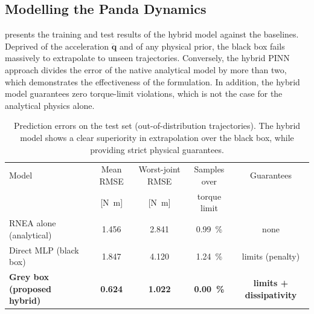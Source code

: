 \documentclass[a4paper, oneside]{article}
\newcommand{\qdd}{\ensuremath{\boldsymbol{\ddot{q}}}}
\begin{document}
\subsection{Modelling the Panda Dynamics}
\label{sec-res-baselines}

 presents the training and test results of the hybrid model against the baselines. Deprived of the acceleration $\qdd$ and of any physical prior, the black box fails massively to extrapolate to unseen trajectories. Conversely, the hybrid PINN approach divides the error of the native analytical model by more than two, which demonstrates the effectiveness of the formulation. In addition, the hybrid model guarantees zero torque-limit violations, which is not the case for the analytical physics alone.

\begin{table}[htbp]
\centering
\caption{Prediction errors on the test set (out-of-distribution trajectories). The hybrid model shows a clear superiority in extrapolation over the black box, while providing strict physical guarantees.}
\label{tab-baselines}
\small
\begin{tabular}{@{}lcccc@{}}
\toprule
Model & Mean RMSE & Worst-joint RMSE & Samples over & Guarantees \\
 & [\si{\newton\meter}] & [\si{\newton\meter}] & torque limit & \\
\midrule
RNEA alone (analytical) & \num{1.456} & \num{2.841} & \SI{0.99}{\percent} & none \\
Direct MLP (black box) & \num{1.847} & \num{4.120} & \SI{1.24}{\percent} & limits (penalty) \\
\textbf{Grey box (proposed hybrid)} & \textbf{\num{0.624}} & \textbf{\num{1.022}} & \textbf{\SI{0.00}{\percent}} & \textbf{limits + dissipativity} \\
\bottomrule
\end{tabular}
\end{table}
\end{document}

